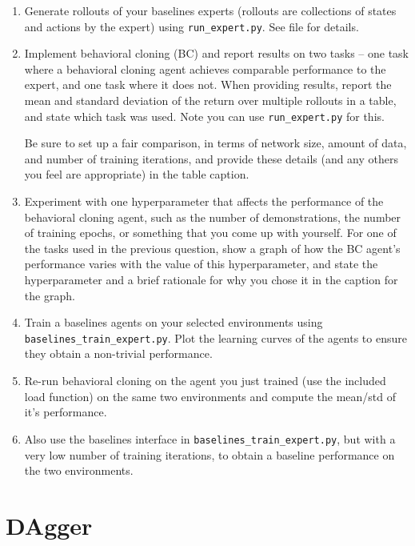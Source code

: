 \documentclass[12pt,twoside]{article}
\begin{document}
\begin{enumerate}
\item Generate rollouts of your baselines experts (rollouts are collections of states and actions by the expert) using \texttt{run_expert.py}. See file for details.

\item Implement behavioral cloning (BC) and report results on two tasks – one task where a behavioral cloning
agent achieves comparable performance to the expert, and one task where it does not. When providing
results, report the mean and standard deviation of the return over multiple rollouts in a table, and state
which task was used. Note you can use \texttt{run_expert.py} for this. 

Be sure to set up a fair comparison, in terms of network size, amount of data,
and number of training iterations, and provide these details (and any others you feel are appropriate)
in the table caption.

\item Experiment with one hyperparameter that affects the performance of the behavioral cloning agent, such
as the number of demonstrations, the number of training epochs, or
something that you come up with yourself. For one of the tasks used in the previous question, show a
graph of how the BC agent’s performance varies with the value of this hyperparameter, and state the
hyperparameter and a brief rationale for why you chose it in the caption for the graph.
\item Train a baselines agents on your selected environments using \texttt{baselines_train_expert.py}.  Plot the learning curves of the agents to ensure they obtain a non-trivial performance.
\item Re-run behavioral cloning on the agent you just trained (use the included load function) on the same two environments and compute the mean/std of it's performance.
\item Also use the baselines interface in \texttt{baselines_train_expert.py}, but with a very low number of training iterations, to obtain a baseline performance on the two environments. 
\end{enumerate}


\section{DAgger}\label{dagger}
\end{document}
